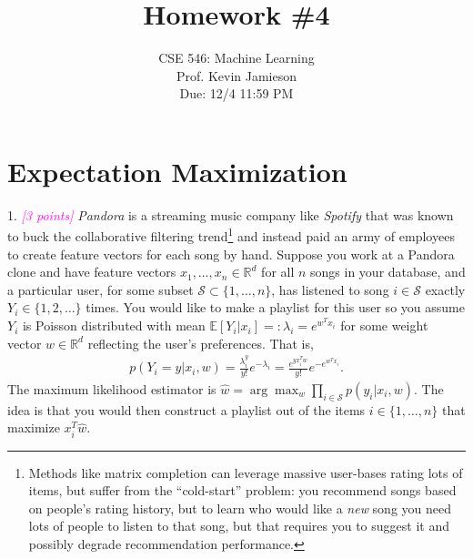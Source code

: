 \documentclass{article}
\date{{}}
\newcommand{\field}[1]{\mathbb{#1}}
\newcommand{\1}{\mathbf{1}}
\newcommand{\E}{\mathbb{E}} %
\newcommand{\R}{\field{R}} %
\newcommand{\grade}[1]{\small\textcolor{magenta}{\emph{[#1 points]}} \normalsize}
\begin{document}
\title{Homework \#4}
\author{\normalsize{CSE 546: Machine Learning}\\
\normalsize{Prof. Kevin Jamieson} \\
\normalsize{Due: 12/4  11:59 PM}}
\maketitle


\section*{Expectation Maximization}
1. \grade{3} \emph{Pandora} is a streaming music company like \emph{Spotify} that was known to buck the collaborative filtering trend\footnote{Methods like matrix completion can leverage massive user-bases rating lots of items, but suffer from the ``cold-start'' problem: you recommend songs based on people's rating history, but to learn who would like a \emph{new} song you need lots of people to listen to that song, but that requires you to suggest it and possibly degrade recommendation performance.} and instead paid an army of employees to create feature vectors for each song by hand. Suppose you work at a Pandora clone and have feature vectors $x_1,\dots,x_n \in \R^d$ for all $n$ songs in your database, and a particular user, for some subset $\mathcal{S} \subset \{1,\dots,n\}$, has listened to song $i \in \mathcal{S}$ exactly $Y_i \in \{1,2,\dots\}$ times. 
You would like to make a playlist for this user so you assume $Y_i$ is Poisson distributed with mean $\E[Y_i | x_i] =: \lambda_i = e^{w^{T} x_i}$ for some weight vector $w \in \R^d$ reflecting the user's preferences. 
That is,
\begin{align*}
p(Y_i=y | x_i, w) = \frac{\lambda_i^y}{y!} e^{-\lambda_i} = \frac{e^{y x_i^T w}}{y!} e^{-e^{w^T x_i}}.
\end{align*}
The maximum likelihood estimator is $\widehat{w} = \arg\max_w \prod_{i \in \mathcal{S}} p(y_i | x_i, w)$.
The idea is that you would then construct a playlist out of the items $i \in \{1,\dots,n\}$ that maximize $x_i^T \widehat{w}$. 
\end{document}
